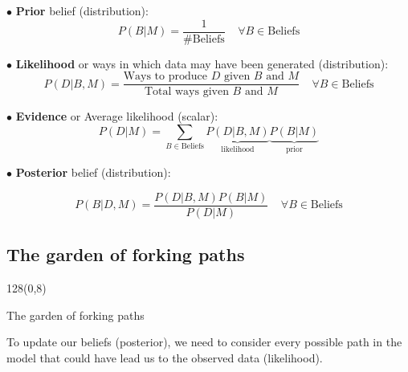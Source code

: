 \documentclass[shownotes]{beamer}
\begin{document}
\begin{frame}
 
 \footnotesize
 
 
$\bullet$ \textbf{Prior} belief (distribution):
 \begin{equation*}
P(B|M) = \frac{1}{\# \text{Beliefs} }  \ \ \ \ \  \forall B \in \text{Beliefs}  
 \end{equation*}

\pause \vspace{0.3cm}


 $\bullet$ \textbf{Likelihood} or ways in which data may have been generated (distribution):
 \begin{equation*}
P(D|B,M) =  \frac{\text{Ways to produce $D$ given $B$ and $M$}}{\text{Total ways given $B$ and $M$}} \ \ \ \ \  \forall  B \in \text{Beliefs}  
 \end{equation*}

 

\pause \vspace{0.3cm}


$\bullet$ \textbf{Evidence} or Average likelihood (scalar):
\begin{equation*}
 P(D|M) = \sum_{B \in \text{Beliefs}} \underbrace{P(D|B,M)}_{\text{likelihood}} \underbrace{P(B|M)}_{\text{prior}}
\end{equation*}

\pause \vspace{0.3cm}

$\bullet$ \textbf{Posterior} belief (distribution):

\begin{equation*}
 P(B|D,M) = \frac{P(D|B,M)P(B|M)}{P(D|M)}\ \ \ \ \  \forall B \in \text{Beliefs}  
\end{equation*}
 
\end{frame}


\subsection{The garden of forking paths}


\begin{frame}
\begin{textblock}{128}(0,8)
\begin{center}
 \large The garden of forking paths
\end{center}
\end{textblock}
\vspace{0.5cm}

 \begin{mdframed}[backgroundcolor=black!15] 
 \centering To update our beliefs (posterior), we need to consider every possible path in the model that could have lead us to the observed data (likelihood).
 \end{mdframed}
 
\end{frame}
\end{document}
